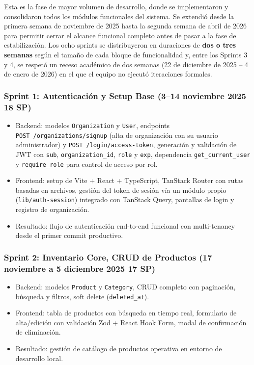 Esta es la fase de mayor volumen de desarrollo, donde se implementaron y consolidaron todos los módulos funcionales del sistema. Se extendió desde la primera semana de noviembre de 2025 hasta la segunda semana de abril de 2026 para permitir cerrar el alcance funcional completo antes de pasar a la fase de estabilización. Los ocho sprints se distribuyeron en duraciones de \textbf{dos o tres semanas} según el tamaño de cada bloque de funcionalidad y, entre los Sprints 3 y 4, se respetó un receso académico de dos semanas (22 de diciembre de 2025 -- 4 de enero de 2026) en el que el equipo no ejecutó iteraciones formales.

\subsubsection{Sprint 1: Autenticación y Setup Base (3--14 noviembre 2025 \textbar{} 18 SP)}\label{sprint-1-autenticaciuxf3n-y-setup-base-314-noviembre-2025-18-sp}

\begin{itemize}
\tightlist
\item
  Backend: modelos \texttt{Organization} y \texttt{User}, endpoints \texttt{POST\ /organizations/signup} (alta de organización con su usuario administrador) y \texttt{POST\ /login/access-token}, generación y validación de JWT con \texttt{sub}, \texttt{organization\_id}, \texttt{role} y \texttt{exp}, dependencia \texttt{get\_current\_user} y \texttt{require\_role} para control de acceso por rol.
\item
  Frontend: setup de Vite + React + TypeScript, TanStack Router con rutas basadas en archivos, gestión del token de sesión vía un módulo propio (\texttt{lib/auth-session}) integrado con TanStack Query, pantallas de login y registro de organización.
\item
  Resultado: flujo de autenticación end-to-end funcional con multi-tenancy desde el primer commit productivo.
\end{itemize}

\subsubsection{Sprint 2: Inventario Core, CRUD de Productos (17 noviembre a 5 diciembre 2025 \textbar{} 17 SP)}\label{sprint-2-inventario-core-crud-de-productos-17-noviembre-a-5-diciembre-2025-17-sp}

\begin{itemize}
\tightlist
\item
  Backend: modelos \texttt{Product} y \texttt{Category}, CRUD completo con paginación, búsqueda y filtros, soft delete (\texttt{deleted\_at}).
\item
  Frontend: tabla de productos con búsqueda en tiempo real, formulario de alta/edición con validación Zod + React Hook Form, modal de confirmación de eliminación.
\item
  Resultado: gestión de catálogo de productos operativa en entorno de desarrollo local.
\end{itemize}

